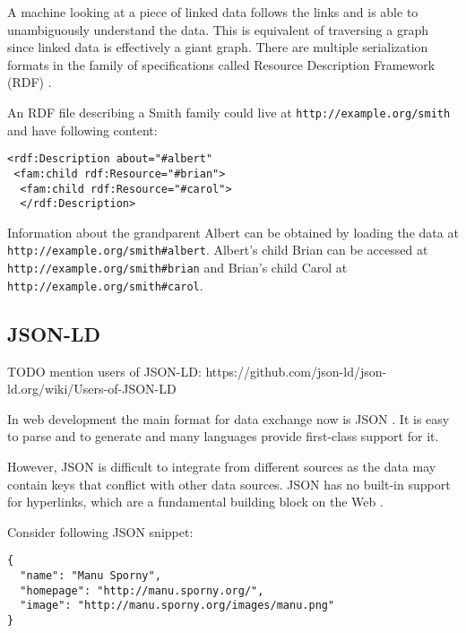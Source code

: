 A machine looking at a piece of linked data follows the links and is able to unambiguously understand the data. This is equivalent of traversing a graph since linked data is effectively a giant graph. There are multiple serialization formats in the family of specifications called Resource Description Framework (RDF) \citep{rdfspecification}.

An RDF file describing a Smith family could live at \lstinline{http://example.org/smith} and have following content:

\lstset{language=XML}
\begin{lstlisting}[caption= Simple example of a person as RDF, label=rdfexample]
<rdf:Description about="#albert"
 <fam:child rdf:Resource="#brian">
  <fam:child rdf:Resource="#carol">
  </rdf:Description>
\end{lstlisting}

Information about the grandparent Albert can be obtained by loading the data at \\ \lstinline{http://example.org/smith#albert}. Albert's child Brian can be accessed at \\  \lstinline{http://example.org/smith#brian} and Brian's child Carol at \lstinline{http://example.org/smith#carol}.

\subsection{JSON-LD}\label{jsonld}

TODO mention users of JSON-LD: https://github.com/json-ld/json-ld.org/wiki/Users-of-JSON-LD

In web development the main format for data exchange now is JSON \citep{jsonformat}. It is easy to parse and to generate and many languages provide first-class support for it.

However, JSON is difficult to integrate from different sources as the data may contain keys that conflict with other data sources. JSON has no built-in support for hyperlinks, which are a fundamental building block on the Web \citep{jsonldbasicconcepts}.

Consider following JSON snippet:

\lstset{language=JSON}
\begin{lstlisting}[caption=Data of a person in the JSON format, label=jsonexample]
{
  "name": "Manu Sporny",
  "homepage": "http://manu.sporny.org/",
  "image": "http://manu.sporny.org/images/manu.png"
}
\end{lstlisting}

